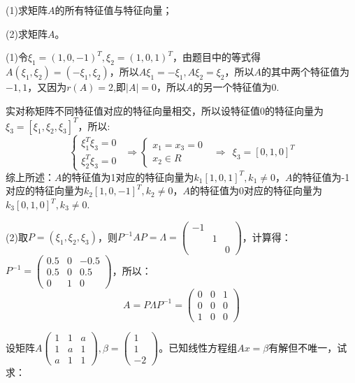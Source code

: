 \documentclass[a4paper]{report}
\begin{document}
(1)求矩阵$A$的所有特征值与特征向量；

(2)求矩阵$A$。

\begin{jie}
(1)令$\xi_1=(1,0,-1)^T,\xi_2=(1,0,1)^T$，由题目中的等式得$A(\xi_1,\xi_2)=(-\xi_1,\xi_2)$，所以$A\xi_1=-\xi_1,A\xi_2=\xi_2$，所以$A$的其中两个特征值为$-1,1$，又因为$r(A)=2$,即$|A|=0$，所以$A$的另一个特征值为0.

实对称矩阵不同特征值对应的特征向量相交，所以设特征值$0$的特征向量为$\xi_3=[\xi_1,\xi_2,\xi_3]^T$，所以:
\begin{equation*}
\begin{cases}
\xi_1^T\xi_3=0\\
\xi_2^T\xi_3=0
\end{cases}~~\Rightarrow
\begin{cases}
x_1=x_3=0\\
x_2\in R
\end{cases}~~~\Rightarrow~~\xi_3=[0,1,0]^T
\end{equation*}
综上所述：$A$的特征值为1对应的特征向量为$k_1[1,0,1]^T,k_1\neq 0$，$A$的特征值为-1对应的特征向量为$k_2[1,0,-1]^T,k_2\neq 0$，$A$的特征值为0对应的特征向量为$k_3[0,1,0]^T,k_3\neq 0$.

(2)取$P=(\xi_1,\xi_2,\xi_3)$，则$P^{-1}AP=\Lambda=
\begin{pmatrix}
-1\\&1\\&&0
\end{pmatrix}
$，计算得：$
P^{-1}=
\begin{pmatrix}
0.5&0&-0.5\\0.5&0&0.5\\0&1&0
\end{pmatrix}
$，所以：
\begin{equation*}
A=P\Lambda P^{-1}=
\begin{pmatrix}
0&0&1\\0&0&0\\1&0&0
\end{pmatrix}
\end{equation*}
\end{jie}

\EX 设矩阵$A
\begin{pmatrix}
1&1&a\\
1&a&1\\
a&1&1
\end{pmatrix},
\beta=
\begin{pmatrix}
1\\1\\-2
\end{pmatrix}
$。已知线性方程组$Ax=\beta$有解但不唯一，试求：
\end{document}
